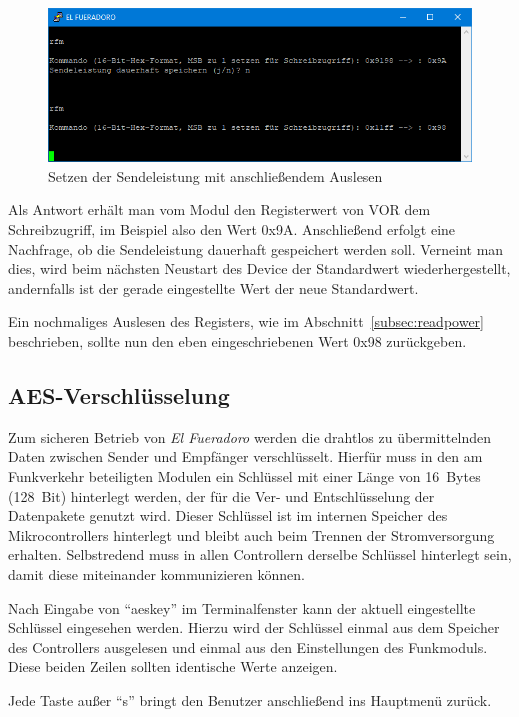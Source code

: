 \documentclass[paper=a4, parskip, numbers=noenddot, toc=listof, headsepline]{scrbook}
\newcommand{\anlage}{\emph{El Fueradoro}}
\begin{document}
					\begin{figure}
						\centering
						\includegraphics[width=.8\textwidth]{Bilder/rfmbefehl2}
						\caption{Setzen der Sendeleistung mit anschließendem Auslesen}
						\label{fig:rfmwrite}
					\end{figure}

					Als Antwort erhält man vom Modul den Registerwert von VOR dem Schreibzugriff, im Beispiel also den Wert 0x9A. Anschließend erfolgt eine Nachfrage, ob die Sendeleistung dauerhaft gespeichert werden soll. Verneint man dies, wird beim nächsten Neustart des Device der Standardwert wiederhergestellt, andernfalls ist der gerade eingestellte Wert der neue Standardwert.

					Ein nochmaliges Auslesen des Registers, wie im Abschnitt~\ref{subsec:readpower} beschrieben, sollte nun den eben eingeschriebenen Wert 0x98 zurückgeben.

			\subsection{AES-Verschlüsselung}
				\label{sec:encryption}

				Zum sicheren Betrieb von {\anlage} werden die drahtlos zu übermittelnden Daten zwischen Sender und Empfänger verschlüsselt. Hierfür muss in den am Funkverkehr beteiligten Modulen ein Schlüssel mit einer Länge von 16~Bytes (128~Bit) hinterlegt werden, der für die Ver- und Entschlüsselung der Datenpakete genutzt wird. Dieser Schlüssel ist im internen Speicher des Mikrocontrollers hinterlegt und bleibt auch beim Trennen der Stromversorgung erhalten. Selbstredend muss in allen Controllern derselbe Schlüssel hinterlegt sein, damit diese miteinander kommunizieren können.

				Nach Eingabe von \enquote{aeskey} im Terminalfenster kann der aktuell eingestellte Schlüssel eingesehen werden. Hierzu wird der Schlüssel einmal aus dem Speicher des Controllers ausgelesen und einmal aus den Einstellungen des Funkmoduls. Diese beiden Zeilen sollten identische Werte anzeigen.

				Jede Taste außer \enquote{s} bringt den Benutzer anschließend ins Hauptmenü zurück.
\end{document}
